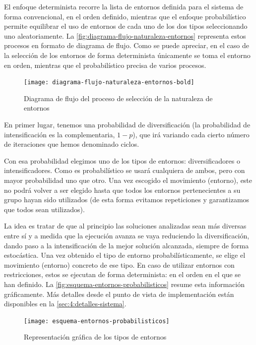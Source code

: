 El enfoque determinista recorre la lista de entornos definida para el sistema de forma convencional, en el orden definido, mientras que el enfoque probabilístico permite equilibrar el uso de entornos de cada uno de los dos tipos seleccionando uno aleatoriamente. La \autoref{fig:diagrama-flujo-naturaleza-entornos} representa  estos procesos en formato de diagrama de flujo. Como se puede apreciar, en el caso de la selección de los entornos de forma determinista únicamente se toma el entorno en orden, mientras que el probabilístico precisa de varios procesos.

\begin{figure}
    \centering    \texttt{[image: diagrama-flujo-naturaleza-entornos-bold]}
    \caption{Diagrama de flujo del proceso de selección de la naturaleza de entornos}
    \label{fig:diagrama-flujo-naturaleza-entornos}
\end{figure}

En primer lugar, tenemos una probabilidad de diversificación (la probabilidad de intensificación es la complementaria, $1-p$), que irá variando cada cierto número de iteraciones que hemos denominado ciclos.

Con esa probabilidad elegimos uno de los tipos de entornos: diversificadores o intensificadores. Como es probabilístico se usará cualquiera de ambos, pero con mayor probabilidad uno que otro. Una vez escogido el movimiento (entorno), este no podrá volver a ser elegido hasta que todos los entornos pertenecientes a su grupo hayan sido utilizados (de esta forma evitamos repeticiones y garantizamos que todos sean utilizados).

La idea es tratar de que al principio las soluciones analizadas sean más diversas entre sí y a medida que la ejecución avanza se vaya reduciendo la diversificación, dando paso a la intensificación de la mejor solución alcanzada, siempre de forma estocástica. Una vez obtenido el tipo de entorno probabilísticamente, se elige el movimiento (entorno) concreto de ese tipo. En caso de utilizar entornos con restricciones, estos se ejecutan de forma determinista: en el orden en el que se han definido. La \autoref{fig:esquema-entornos-probabilisticos} resume esta información gráficamente. Más detalles desde el punto de vista de implementación están disponibles en la \autoref{sec:4:detalles-sistema}.

\begin{figure}
    \centering    \texttt{[image: esquema-entornos-probabilisticos]}
    \caption{Representación gráfica de los tipos de entornos}
    \label{fig:esquema-entornos-probabilisticos}
\end{figure}


